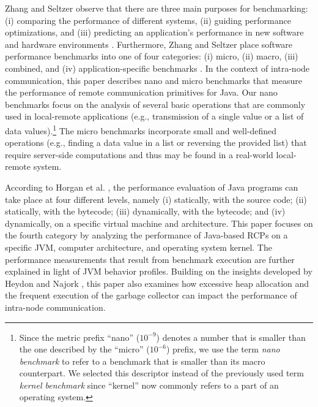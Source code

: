 \documentclass{sig-alternate}
\begin{document}
\begin{sloppypar}
Zhang and Seltzer observe that there are three main purposes for
benchmarking: (i) comparing the performance of different systems, (ii)
guiding performance optimizations, and (iii) predicting an
application's performance in new software and hardware environments
\cite{zhang-hbenchjava}.  Furthermore, Zhang and Seltzer place
software performance benchmarks into one of four categories: (i)
micro, (ii) macro, (iii) combined, and (iv) application-specific
benchmarks \cite{zhang-hbenchjava}.  In the context of intra-node
communication, this paper describes nano and micro benchmarks that
measure the performance of remote communication primitives for Java.
Our nano benchmarks focus on the analysis of several basic operations
that are commonly used in local-remote applications (e.g.,
transmission of a single value or a list of data
values).\footnote{{\small Since the metric prefix ``nano'' ($10^{-9}$)
    denotes a number that is smaller than the one described by the
    ``micro'' ($10^{-6}$) prefix, we use the term {\em nano benchmark}
    to refer to a benchmark that is smaller than its macro
    counterpart.  We selected this descriptor instead of the
    previously used term {\em kernel benchmark} \cite{agarwal-sp2}
    since ``kernel'' now commonly refers to a part of an operating
    system. }}  The micro benchmarks incorporate small and
well-defined operations (e.g., finding a data value in a list or
reversing the provided list) that require server-side computations and
thus may be found in a real-world local-remote system.
\end{sloppypar}

According to Horgan et al. \cite{horgan-measure-runtime}, the
performance evaluation of Java programs can take place at four
different levels, namely (i) statically, with the source code; (ii)
statically, with the bytecode; (iii) dynamically, with the bytecode;
and (iv) dynamically, on a specific virtual machine and architecture.
This paper focuses on the fourth category by analyzing the performance
of Java-based RCPs on a specific JVM, computer architecture, and
operating system kernel. The performance measurements that result from
benchmark execution are further explained in light of JVM behavior
profiles.  Building on the insights developed by Heydon and Najork
\cite{heydon-java-core}, this paper also examines how excessive heap
allocation and the frequent execution of the garbage collector can
impact the performance of intra-node communication.
\end{document}

